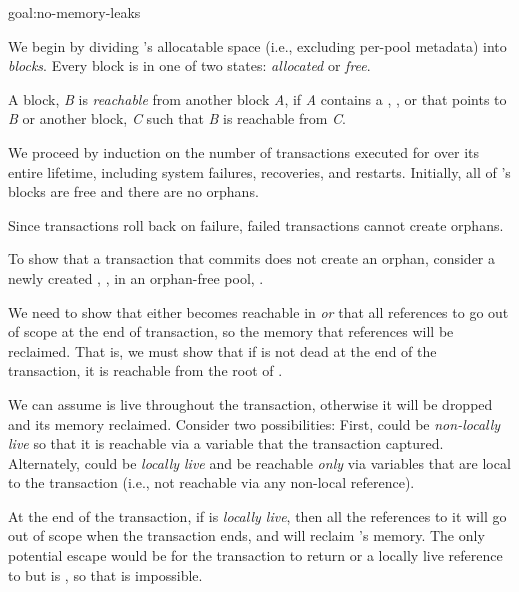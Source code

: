 \begin{goalparttrue}{goal:no-memory-leaks}
  
We begin by dividing 's allocatable space (i.e., excluding per-pool
metadata) into \emph{blocks}.  Every block is in one of two states:
\emph{allocated} or \emph{free}.

A block, \emph{B} is \emph{reachable} from another block \emph{A}, if \emph{A}
contains a , , or  that points to \emph{B} or another
block, \emph{C} such that \emph{B} is reachable from \emph{C}.


We proceed by induction on the number of transactions executed for 
over its entire lifetime, including system failures, recoveries, and
restarts.  Initially, all of 's blocks are free and there are no orphans.

Since transactions roll back on failure, failed transactions cannot create
orphans.

To show that a \this{} transaction that commits does not create an orphan, consider a newly
created , , in an orphan-free pool, .

We need to show that either  becomes reachable
in  \emph{or} that all references to  go out of scope
at the end of transaction, so the memory that  references will be
reclaimed.  That is, we must show that if  is
not dead at the end of the transaction, it is reachable from the root
of .

We can assume  is live throughout the transaction, otherwise it will be
dropped and its memory reclaimed.  Consider two possibilities: First,  could be \emph{non-locally
live} so that it is reachable via a variable that the transaction captured.
Alternately,  could be \emph{locally live} and be reachable \emph{only}
via variables that are local to the transaction (i.e., not reachable via any
non-local reference).

At the end of the transaction, if  is \emph{locally live}, then all the
references to it will go out of scope when the transaction ends, and \this{}
will reclaim 's memory.  The only potential escape would be for the
transaction to return  or a locally live reference to  but  is , so that is impossible.


\end{goalparttrue}
